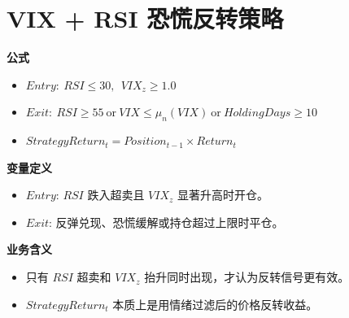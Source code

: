 \documentclass[11pt,a4paper]{ctexart}
\begin{document}
\section*{VIX + RSI 恐慌反转策略}
\textbf{公式}
\begin{itemize}
\item $Entry:\ RSI \leq 30,\ \ VIX_z \geq 1.0$
\item $Exit:\ RSI \geq 55\ \mathrm{or}\ VIX \leq \mu_n(VIX)\ \mathrm{or}\ HoldingDays \geq 10$
\item $StrategyReturn_t=Position_{t-1}\times Return_t$
\end{itemize}
\textbf{变量定义}
\begin{itemize}
\item $Entry$: $RSI$ 跌入超卖且 $VIX_z$ 显著升高时开仓。
\item $Exit$: 反弹兑现、恐慌缓解或持仓超过上限时平仓。
\end{itemize}
\textbf{业务含义}
\begin{itemize}
\item 只有 $RSI$ 超卖和 $VIX_z$ 抬升同时出现，才认为反转信号更有效。
\item $StrategyReturn_t$ 本质上是用情绪过滤后的价格反转收益。
\end{itemize}
        
\end{document}

